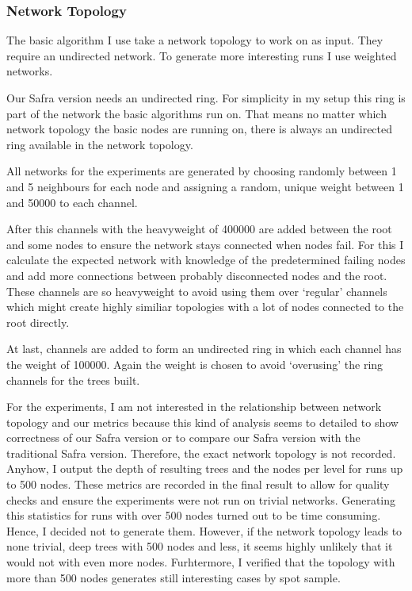 \subsubsection{Network Topology}
  The basic algorithm I use take a network topology to work on as input. 
  They require an undirected network.
  To generate more interesting runs I use weighted networks.
  
  Our Safra version needs an undirected ring. 
  For simplicity in my setup this ring is part of the network the basic algorithms run on. 
  That means no matter which network topology the basic nodes are running on, there is always an undirected ring available in the network topology.
  
  All networks for the experiments are generated by choosing randomly between 1 and 5 neighbours for each node and assigning a random, unique weight between 1 and 50000 to each channel.
  
  After this channels with the heavyweight of 400000 are added between the root and some nodes to ensure the network stays connected when nodes fail.
  For this I calculate the expected network with knowledge of the predetermined failing nodes and add more connections between probably disconnected nodes and the root.
  These channels are so heavyweight to avoid using them over `regular' channels which might create highly similiar topologies with a lot of nodes connected to the root directly.
  
  At last, channels are added to form an undirected ring in which each channel has the weight of 100000. 
  Again the weight is chosen to avoid `overusing' the ring channels for the trees built.
  
  For the experiments, I am not interested in the relationship between network topology and our metrics because this kind of analysis seems to detailed to show correctness of our Safra version or to compare
  our Safra version with the traditional Safra version.
  Therefore, the exact network topology is not recorded. 
  Anyhow, I output the depth of resulting trees and the nodes per level for runs up to 500 nodes.
  These metrics are recorded in the final result to allow for quality checks and ensure the experiments were not run on trivial networks.
  Generating this statistics for runs with over 500 nodes turned out to be time consuming.
  Hence, I decided not to generate them.
  However, if the network topology leads to none trivial, deep trees with 500 nodes and less, it seems highly unlikely that it would not with even more nodes.
  Furhtermore, I verified that the topology with more than 500 nodes generates still interesting cases by spot sample.
  